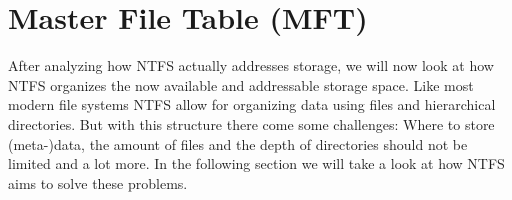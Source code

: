 \section{Master File Table (MFT)}
\label{sec:MFT}
After analyzing how NTFS actually addresses storage, we will now look at how NTFS organizes the now available and addressable storage space. Like most modern file systems NTFS allow for organizing data using files and hierarchical directories. But with this structure there come some challenges: Where to store (meta-)data, the amount of files and the depth of directories should not be limited and a lot more. In the following section we will take a look at how NTFS aims to solve these problems.\\


